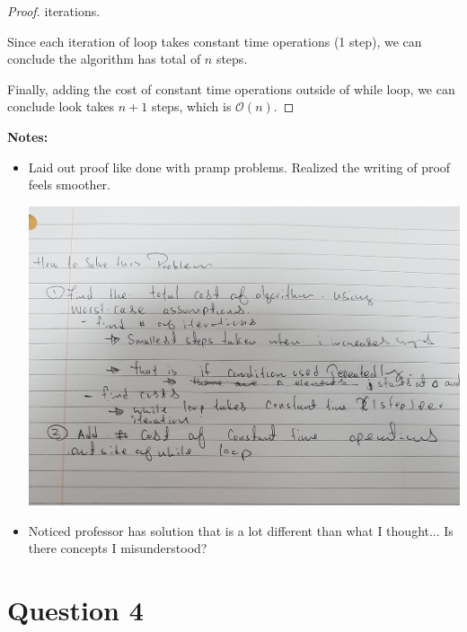 \documentclass[12pt]{article}
\begin{document}
\begin{enumerate}[a.]
\begin{proof}
        iterations.

        \bigskip

        Since each iteration of loop takes constant time operations (1 step),
        we can conclude the algorithm has total of $n$ steps.

        \bigskip

        Finally, adding the cost of constant time operations outside of while loop,
        we can conclude look takes $n+1$ steps, which is $\mathcal{O}(n)$.
    \end{proof}

    \bigskip

    \textbf{Notes:}

    \begin{itemize}
        \item Laid out proof like done with pramp problems. Realized the writing
        of proof feels smoother.

        \begin{center}
        \includegraphics[width=\linewidth]{images/problem_set_4_comments_1.jpg}
        \end{center}

        \item Noticed professor has solution that is a lot different
        than what I thought... Is there concepts I misunderstood?
    \end{itemize}


\end{enumerate}

\section*{Question 4}
\end{document}
